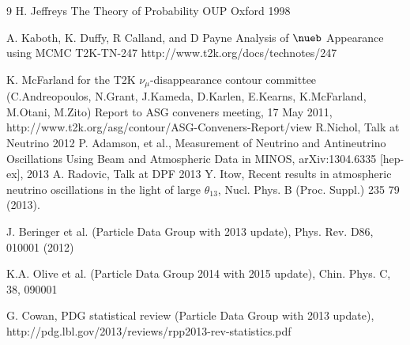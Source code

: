 \begin{thebibliography}{9}
	H. Jeffreys
	The Theory of Probability
	OUP Oxford
	1998
	
	A. Kaboth, K. Duffy, R Calland, and D Payne
	Analysis of $\nueb$ Appearance using MCMC
	T2K-TN-247
	http://www.t2k.org/docs/technotes/247

 
%
%
  K. McFarland for the T2K $\nu_{\mu}$-disappearance contour committee 
  (C.Andreopoulos, N.Grant, J.Kameda, D.Karlen, E.Kearns, K.McFarland, M.Otani, M.Zito)
  Report to ASG conveners meeting, 17 May 2011,
  http://www.t2k.org/asg/contour/ASG-Conveners-Report/view
%
%
  R.Nichol,
  Talk at Neutrino 2012
  P. Adamson, et al.,
  Measurement of Neutrino and Antineutrino Oscillations Using Beam and Atmospheric Data in MINOS,
  arXiv:1304.6335 [hep-ex], 2013
  A. Radovic,
  Talk at DPF 2013
  Y. Itow,
  Recent results in atmospheric neutrino oscillations in the light of large $\theta_{13}$,
  Nucl. Phys. B (Proc. Suppl.) 235 79 (2013).

J. Beringer et al. (Particle Data Group with 2013 update), 
Phys. Rev. D86, 010001 (2012)

K.A. Olive et al. (Particle Data Group 2014 with 2015 update), 
Chin. Phys. C, 38, 090001

G. Cowan, PDG statistical review (Particle Data Group with 2013 update),
http://pdg.lbl.gov/2013/reviews/rpp2013-rev-statistics.pdf


\end{thebibliography}
